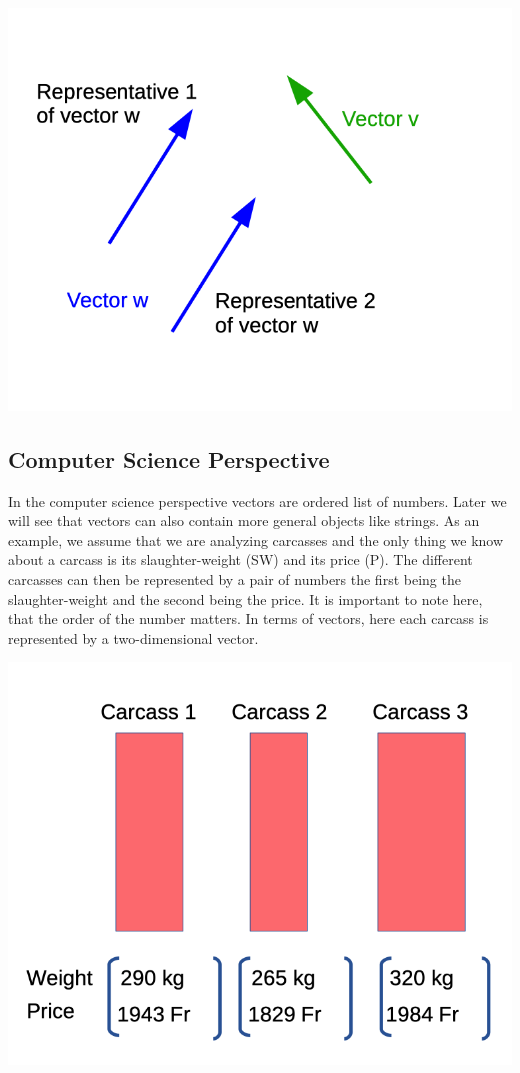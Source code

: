 \documentclass[]{book}
\theoremstyle{definition}
\theoremstyle{definition}
\theoremstyle{definition}
\theoremstyle{remark}
\begin{document}
\includegraphics{odg/vector-physics-perspective.png}

\hypertarget{intro-linalg-computer-science-perspective}{%
\subsection{Computer Science Perspective}\label{intro-linalg-computer-science-perspective}}

In the computer science perspective vectors are ordered list of numbers. Later we will see that vectors can also contain more general objects like strings. As an example, we assume that we are analyzing carcasses and the only thing we know about a carcass is its slaughter-weight (SW) and its price (P). The different carcasses can then be represented by a pair of numbers the first being the slaughter-weight and the second being the price. It is important to note here, that the order of the number matters. In terms of vectors, here each carcass is represented by a two-dimensional vector.

\includegraphics{odg/vector-cs-perspecitve.png}
\end{document}
